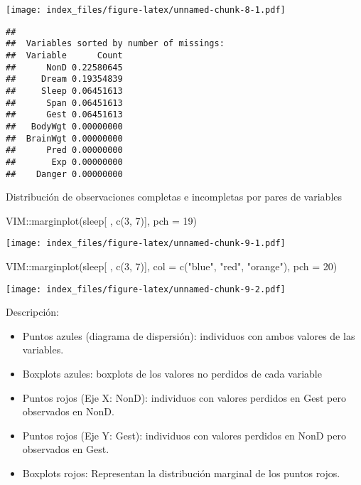 \documentclass[
]{article}
\newenvironment{Shaded}{\begin{snugshade}}{\end{snugshade}}
\newcommand{\AttributeTok}[1]{\textcolor[rgb]{0.77,0.63,0.00}{#1}}
\newcommand{\DecValTok}[1]{\textcolor[rgb]{0.00,0.00,0.81}{#1}}
\newcommand{\FunctionTok}[1]{\textcolor[rgb]{0.00,0.00,0.00}{#1}}
\newcommand{\NormalTok}[1]{#1}
\newcommand{\SpecialCharTok}[1]{\textcolor[rgb]{0.00,0.00,0.00}{#1}}
\newcommand{\StringTok}[1]{\textcolor[rgb]{0.31,0.60,0.02}{#1}}
\begin{document}
\texttt{[image: index\_files/figure-latex/unnamed-chunk-8-1.pdf]}

\begin{verbatim}
## 
##  Variables sorted by number of missings: 
##  Variable      Count
##      NonD 0.22580645
##     Dream 0.19354839
##     Sleep 0.06451613
##      Span 0.06451613
##      Gest 0.06451613
##   BodyWgt 0.00000000
##  BrainWgt 0.00000000
##      Pred 0.00000000
##       Exp 0.00000000
##    Danger 0.00000000
\end{verbatim}

Distribución de observaciones completas e incompletas por pares de
variables

\begin{Shaded}
\begin{Highlighting}[]
\NormalTok{VIM}\SpecialCharTok{::}\FunctionTok{marginplot}\NormalTok{(sleep[ , }\FunctionTok{c}\NormalTok{(}\DecValTok{3}\NormalTok{, }\DecValTok{7}\NormalTok{)], }\AttributeTok{pch =} \DecValTok{19}\NormalTok{)}
\end{Highlighting}
\end{Shaded}

\texttt{[image: index\_files/figure-latex/unnamed-chunk-9-1.pdf]}

\begin{Shaded}
\begin{Highlighting}[]
\NormalTok{VIM}\SpecialCharTok{::}\FunctionTok{marginplot}\NormalTok{(sleep[ , }\FunctionTok{c}\NormalTok{(}\DecValTok{3}\NormalTok{, }\DecValTok{7}\NormalTok{)], }\AttributeTok{col =} \FunctionTok{c}\NormalTok{(}\StringTok{"blue"}\NormalTok{, }\StringTok{"red"}\NormalTok{, }\StringTok{"orange"}\NormalTok{), }\AttributeTok{pch =} \DecValTok{20}\NormalTok{)}
\end{Highlighting}
\end{Shaded}

\texttt{[image: index\_files/figure-latex/unnamed-chunk-9-2.pdf]}

Descripción:

\begin{itemize}
\item
  Puntos azules (diagrama de dispersión): individuos con ambos valores
  de las variables.
\item
  Boxplots azules: boxplots de los valores no perdidos de cada variable
\item
  Puntos rojos (Eje X: NonD): individuos con valores perdidos en Gest
  pero observados en NonD.
\item
  Puntos rojos (Eje Y: Gest): individuos con valores perdidos en NonD
  pero observados en Gest.
\item
  Boxplots rojos: Representan la distribución marginal de los puntos
  rojos.
\end{itemize}
\end{document}
